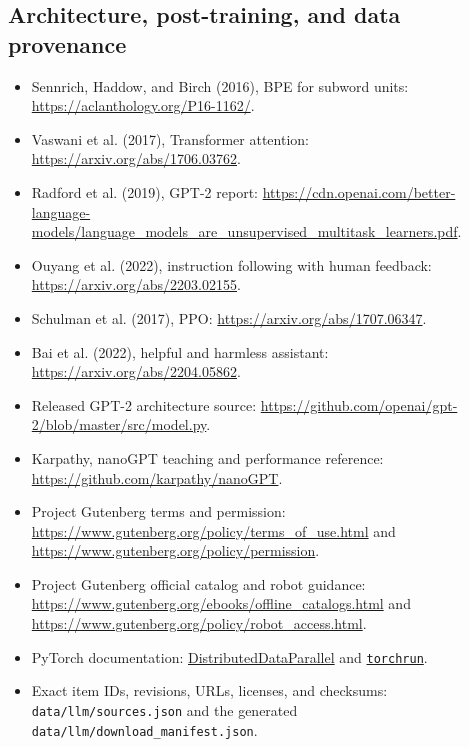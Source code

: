 \documentclass[11pt]{article}
\begin{document}
\subsection*{Architecture, post-training, and data provenance}
\begin{itemize}
\item Sennrich, Haddow, and Birch (2016), BPE for subword units: \url{https://aclanthology.org/P16-1162/}.
\item Vaswani et al. (2017), Transformer attention: \url{https://arxiv.org/abs/1706.03762}.
\item Radford et al. (2019), GPT-2 report: \url{https://cdn.openai.com/better-language-models/language_models_are_unsupervised_multitask_learners.pdf}.
\item Ouyang et al. (2022), instruction following with human feedback: \url{https://arxiv.org/abs/2203.02155}.
\item Schulman et al. (2017), PPO: \url{https://arxiv.org/abs/1707.06347}.
\item Bai et al. (2022), helpful and harmless assistant: \url{https://arxiv.org/abs/2204.05862}.
\item Released GPT-2 architecture source:
\url{https://github.com/openai/gpt-2/blob/master/src/model.py}.
\item Karpathy, nanoGPT teaching and performance reference: \url{https://github.com/karpathy/nanoGPT}.
\item Project Gutenberg terms and permission: \url{https://www.gutenberg.org/policy/terms_of_use.html} and \url{https://www.gutenberg.org/policy/permission}.
\item Project Gutenberg official catalog and robot guidance: \url{https://www.gutenberg.org/ebooks/offline_catalogs.html} and \url{https://www.gutenberg.org/policy/robot_access.html}.
\item PyTorch documentation: \href{https://docs.pytorch.org/docs/stable/generated/torch.nn.parallel.DistributedDataParallel.html}{DistributedDataParallel} and \href{https://docs.pytorch.org/docs/stable/elastic/run.html}{\texttt{torchrun}}.
\item Exact item IDs, revisions, URLs, licenses, and checksums: \texttt{data/llm/sources.json} and the generated \texttt{data/llm/download\_manifest.json}.
\end{itemize}
\end{document}
